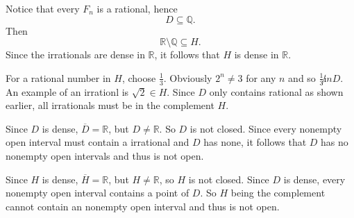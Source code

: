 \documentclass[12pt]{article}
\begin{document}
\begin{enumerate}[label=(\alph*)]
          Notice that every \( F_n \) is a rational, hence
          \[
              D \subseteq \mathbb{Q}.
          \]
          Then
          \[
              \mathbb{R} \setminus \mathbb{Q} \subseteq  H.
          \]
          Since the irrationals are dense in \( \mathbb{R} \), it follows that \( H \) is dense in \( \mathbb{R} \).

          For a rational number in \( H \), choose \( \frac{1}{3} \).
          Obviously \( 2^n \neq 3 \) for any \( n \) and so \( \frac{1}{3} \not in D \). An example of an irrationl is \( \sqrt{2} \in H \). Since \( D \) only contains rational as shown earlier, all irrationals must be in the complement \( H \).

          Since \( D \) is dense, \( \overline{D} = \mathbb{R}\), but \( D \neq \mathbb{R} \). So \( D \) is not closed. Since every nonempty open interval must contain a irrational and \( D \) has none, it follows that \( D \) has no nonempty open intervals and thus is not open.

          Since \( H  \) is dense, \( \overline{H} = \mathbb{R} \), but \( H \neq  \mathbb{R} \), so \( H \) is not closed. Since \( D  \) is dense, every nonempty open interval contains a point of \( D \). So \( H \) being the complement cannot contain an nonempty open interval and thus is not open.

\end{enumerate}
\end{document}
